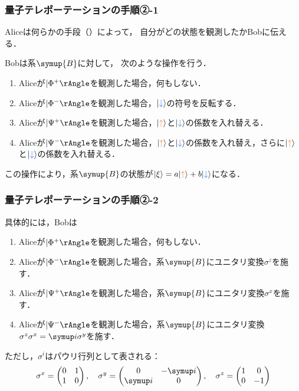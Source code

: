 \documentclass[
    10pt,
    ]{sotsu-beamer}
\newcommand{\bitone}{\mathcolor{fire}{\uparrow}}
\newcommand{\bittwo}{\mathcolor{water}{\downarrow}}
\begin{document}
\begin{frame}
    \frametitle{量子テレポーテーションの手順②-1}

    Aliceは何らかの手段（）によって，
    自分がどの状態を観測したかBobに伝える．

    Bobは系$\symup{B}$に対して，
    次のような操作を行う．
    \begin{enumerate}
        \item Aliceが$\Ket{\Phi^+}$を観測した場合，何もしない．
        \item Aliceが$\Ket{\Phi^-}$を観測した場合，$\ket{\bittwo}$の符号を反転する．
        \item Aliceが$\Ket{\Psi^+}$を観測した場合，$\ket{\bitone}$と$\ket{\bittwo}$の係数を入れ替える．
        \item Aliceが$\Ket{\Psi^-}$を観測した場合，$\ket{\bitone}$と$\ket{\bittwo}$の係数を入れ替え，さらに$\ket{\bitone}$と$\ket{\bittwo}$の係数を入れ替える．
    \end{enumerate}
    この操作により，系$\symup{B}$の状態が$\ket{\xi} = a \ket{\bitone} + b \ket{\bittwo}$になる．

\end{frame}


\begin{frame}
    \frametitle{量子テレポーテーションの手順②-2}

    具体的には，Bobは
    \begin{enumerate}
        \item Aliceが$\Ket{\Phi^+}$を観測した場合，何もしない．
        \item Aliceが$\Ket{\Phi^-}$を観測した場合，系$\symup{B}$にユニタリ変換$\sigma^z$を施す．
        \item Aliceが$\Ket{\Psi^+}$を観測した場合，系$\symup{B}$にユニタリ変換$\sigma^x$を施す．
        \item Aliceが$\Ket{\Psi^-}$を観測した場合，系$\symup{B}$にユニタリ変換$\sigma^z \sigma^x = \iu \sigma^y$を施す．
    \end{enumerate}
    ただし，$\sigma^i$はパウリ行列として表される：
    \begin{equation}
        \label{eq:Pauli-matrix}
        \sigma^x = 
        \begin{pmatrix}
            0  &  1  \\
            1  &  0
        \end{pmatrix},
        \quad 
        \sigma^y = 
        \begin{pmatrix}
            0  &  -\iu  \\
            \iu  &  0  
        \end{pmatrix},
        \quad 
        \sigma^z = 
        \begin{pmatrix}
            1  &  0  \\
            0  &  -1
        \end{pmatrix}
    \end{equation}
    
\end{frame}
\end{document}

